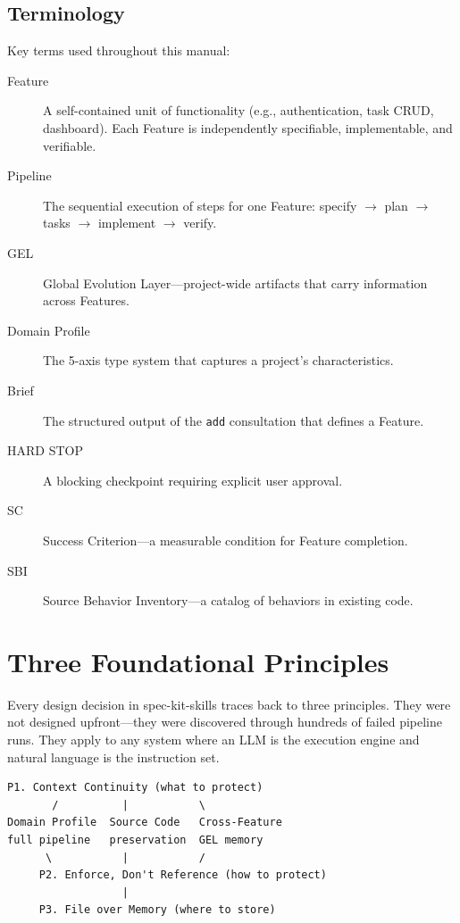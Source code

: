 \documentclass[11pt,a4paper,openright,twoside]{report}
\begin{document}
\section{Terminology}

Key terms used throughout this manual:

\begin{description}
  \item[Feature] A self-contained unit of functionality (e.g., authentication, task CRUD, dashboard). Each Feature is independently specifiable, implementable, and verifiable.
  \item[Pipeline] The sequential execution of steps for one Feature: specify $\rightarrow$ plan $\rightarrow$ tasks $\rightarrow$ implement $\rightarrow$ verify.
  \item[GEL] Global Evolution Layer---project-wide artifacts that carry information across Features.
  \item[Domain Profile] The 5-axis type system that captures a project's characteristics.
  \item[Brief] The structured output of the \texttt{add} consultation that defines a Feature.
  \item[HARD STOP] A blocking checkpoint requiring explicit user approval.
  \item[SC] Success Criterion---a measurable condition for Feature completion.
  \item[SBI] Source Behavior Inventory---a catalog of behaviors in existing code.
\end{description}


\chapter{Three Foundational Principles}
\label{ch:principles}

Every design decision in spec-kit-skills traces back to three principles. They were not designed upfront---they were discovered through hundreds of failed pipeline runs. They apply to any system where an LLM is the execution engine and natural language is the instruction set.

\begin{lstlisting}[title={Principle Hierarchy}]
        P1. Context Continuity (what to protect)
       /          |           \
Domain Profile  Source Code   Cross-Feature
full pipeline   preservation  GEL memory
      \           |           /
     P2. Enforce, Don't Reference (how to protect)
                  |
     P3. File over Memory (where to store)
\end{lstlisting}
\end{document}
